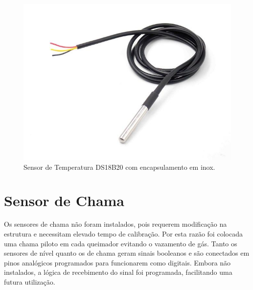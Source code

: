 \begin{figure}[htb]
	\caption{\label{SensordeTemperatura}Sensor de Temperatura DS18B20 com encapsulamento em inox.}
	\begin{center}
	    \includegraphics[width=0.45\linewidth]{./img/SensordeTemperatura.jpg}
	\end{center}
\end{figure}

		\section{Sensor de Chama}
Os sensores de chama não foram instalados, pois requerem modificação na estrutura e necessitam elevado tempo de calibração. Por esta razão foi colocada uma chama piloto em cada queimador evitando o vazamento de gás. Tanto os sensores de nível quanto os de chama geram sinais booleanos e são conectados em pinos analógicos programados para funcionarem como digitais. Embora não instalados, a lógica de recebimento do sinal foi programada, facilitando uma futura utilização.


